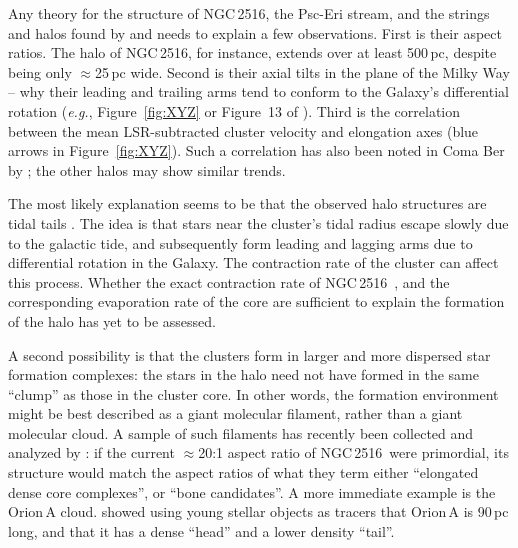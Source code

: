 \documentclass[12pt,twocolumn,tighten]{aastex63}
\newcommand{\cn}{NGC\,2516} %
\begin{document}
Any theory for the structure of \cn, the Psc-Eri stream, and the
strings and halos found by  and
 needs to explain a few observations.  First
is their aspect ratios.  The halo of \cn, for instance, extends over
at least 500\,pc, despite being only $\approx$25\,pc wide.  Second is
their axial tilts in the plane of the Milky Way -- why their leading
and trailing arms tend to conform to the Galaxy's differential
rotation ({\it e.g.}, Figure~\ref{fig:XYZ} or Figure~13 of
).  Third is the correlation between the
mean LSR-subtracted cluster velocity and elongation axes (blue arrows
in Figure~\ref{fig:XYZ}).  Such a correlation has also been noted in
Coma Ber by \citet{tang_comaber_2019}; the other halos may show
similar trends.

The most likely explanation seems to be that the observed halo
structures are tidal tails \citep[{\it
e.g.},][]{chumak_tails_2006,krumholz_star_2019}. The idea is that
stars near the cluster's tidal radius escape slowly due to the
galactic tide, and subsequently form leading and lagging arms due to
differential rotation in the Galaxy.  The contraction rate of the
cluster can affect this process.  Whether the exact contraction rate
of \cn\ \citep{healy_stellar_2020}, and the corresponding evaporation
rate of the core are sufficient to explain the formation of the halo
has yet to be assessed. 

A second possibility is that the clusters form in larger and more
dispersed star formation complexes: the stars in the halo need not
have formed in the same ``clump'' as those in the cluster core.  In
other words, the formation environment might be best described as a
giant molecular filament, rather than a giant molecular cloud.  A
sample of such filaments has recently been collected and analyzed by
\citet{zucker_physical_2018}: if the current $\approx$20:1 aspect
ratio of \cn\ were primordial, its structure would match the aspect
ratios of what they term either ``elongated dense core complexes'', or
``bone candidates''.  A more immediate example is the Orion\,A cloud.
\citet{grosschedl_3d_2018} showed using young stellar objects as
tracers that Orion\,A is 90\,pc long, and that it has a dense ``head''
and a lower density ``tail''.
\end{document}
